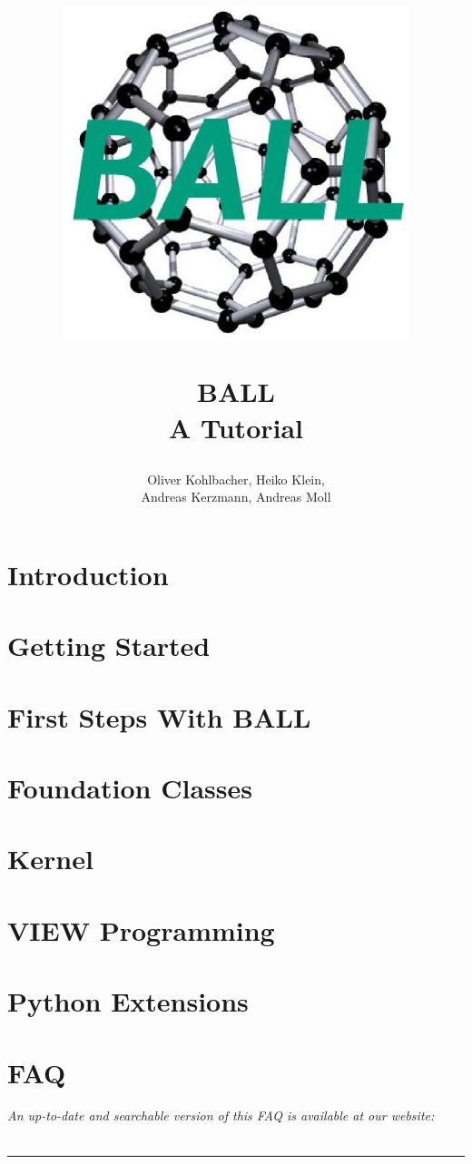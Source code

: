 \documentclass[12pt,twoside]{report}
\author{Oliver Kohlbacher, Heiko Klein,\\ Andreas Kerzmann, Andreas Moll}
\title{
  \begin{center}
    \includegraphics[width=10cm]{logo.eps}
  \end{center}
  \Huge BALL\\ 
  \Large A Tutorial
}
\begin{document}
\setcounter{page}{1}
\maketitle

\tableofcontents
\clearpage

\setcounter{page}{1}


\chapter{Introduction}
\label{chapter:introduction}



\chapter{Getting Started}
\label{chapter:getting-started}




\chapter{First Steps With BALL}
\label{chapter:first-steps}




\chapter{Foundation Classes}
\label{chapter:foundation-classes}




\chapter{Kernel}
\label{chapter:kernel}


\chapter{VIEW Programming}
\label{chapter:view-programming}


\chapter{Python Extensions}
\label{chapter:python}


\chapter{FAQ}
\label{chapter:faq}
\newpage
\noindent
{\it An up-to-date and searchable version of this FAQ is available at our website:\\
}\\
\hspace{1mm}
\rule{\textwidth}{0.1pt}
\hspace{3mm}



\newpage
{}
\tiny
\printindex
\normalsize

\renewcommand{\bibname}{References}


\end{document}
